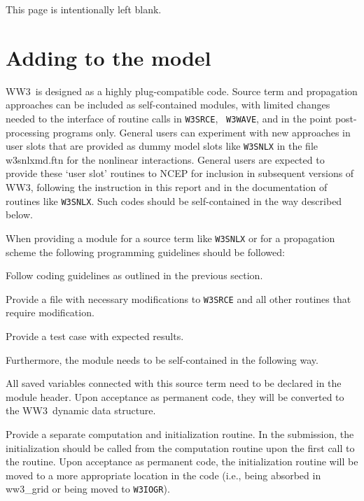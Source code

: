 \documentclass[12pt]{article}
\newcommand{\ws}{WW3}
\newcommand{\file}{\sf}
\newcommand{\code}{\tt}
\newcommand{\pb}{\strut \vfill \pagebreak}
\newcommand{\bpage}{\vfill \pagebreak \strut

\vspace{2.5in} \centerline{This page is intentionally left blank.}}
\newcommand{\newsec}{\setcounter{equation}{0}
                      \setcounter{myfigno}{0}
                      \setcounter{mytabno}{0}}
\newcounter{myfigno}[section]
\newcounter{mytabno}[section]
\newcounter{mylistno}
\begin{document}
\pb
\bpage
\pb
\section{Adding to the model} \label{sec:add}
\newsec

\ws\ is designed as a highly plug-compatible code.  Source term and
propagation approaches can be included as self-contained modules, with limited
changes needed to the interface of routine calls in {\code W3SRCE}, {\code
W3WAVE}, and in the point post-processing programs only. General users can
experiment with new approaches in user slots that are provided as dummy model
slots like {\code W3SNLX} in the file {\file w3snlxmd.ftn} for the nonlinear
interactions. General users are expected to provide these `user slot' routines
to NCEP for inclusion in subsequent versions of \ws, following the instruction
in this report and in the documentation of routines like {\code W3SNLX}.  Such
codes should be self-contained in the way described below.

When providing a module for a source term like {\code W3SNLX} or for a
propagation scheme the following programming guidelines should be followed:

\begin{list}{)}{ \rightmargin 8mm
                                \leftmargin 10mm }
\item Follow coding guidelines as outlined in the previous section.
\item Provide a file with necessary modifications to {\code W3SRCE} and all
      other routines that require modification.
\item Provide a test case with expected results.
\end{list}

\noindent
Furthermore, the module needs to be self-contained in the following way.

\begin{list}{)}{ \rightmargin 8mm
                                \leftmargin 10mm }
\item All saved variables connected with this source term need to be declared
      in the module header. Upon acceptance as permanent code, they will be
      converted to the \ws\ dynamic data structure.
\item Provide a separate computation and initialization routine.  In the
      submission, the initialization should be called from the computation
      routine upon the first call to the routine. Upon acceptance as permanent
      code, the initialization routine will be moved to a more appropriate
      location in the code (i.e., being absorbed in {\file ww3\_grid} or being
      moved to {\code W3IOGR}).
\end{list}
\end{document}
